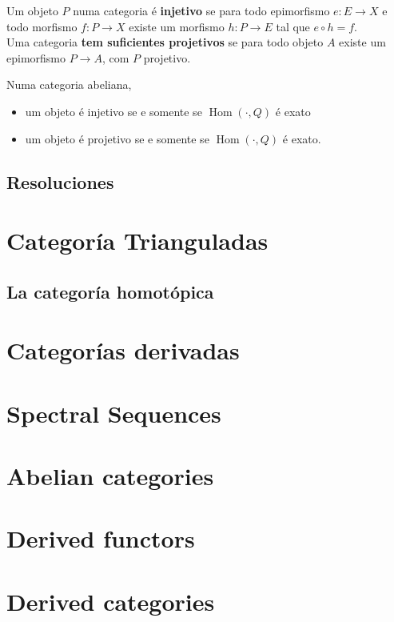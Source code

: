 Um objeto $P$ numa categoria é \textbf{injetivo} se para todo epimorfismo $e:E\rightarrow X$ e todo morfismo $f:P \rightarrow X$ existe um morfismo $h: P\rightarrow E$ tal que $e\circ h =f$.\\
Uma categoria \textbf{tem suficientes projetivos} se para todo objeto $A$ existe um epimorfismo $P\rightarrow A$, com $P$ projetivo.

\begin{prop}
	Numa categoria abeliana, 
	\begin{itemize}
		\item um objeto é injetivo se e somente se $\operatorname{Hom}(\cdot , Q)$ é exato
		\item um objeto é projetivo se e somente se $\operatorname{Hom}(\cdot , Q)$ é exato.
	\end{itemize}
\end{prop}



\subsection{Resoluciones}


\section{Categoría Trianguladas}



\subsection{La categoría homotópica}





\section{Categorías derivadas}








\section{Spectral Sequences}


\section{Abelian categories}

\section{Derived functors}

\section{Derived categories}




